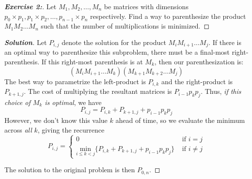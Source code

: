 \documentclass[a4paper]{article}
\newenvironment{solution}{\begin{proof}[\textnormal{\textbf{Solution}}]}{\end{proof}}
\newenvironment{exercise}[1]{\begin{proof}[\textnormal{\textbf{Exercise #1:}}]\phantom{\qedhere}}{\end{proof}}
\theoremstyle{definition}
\begin{document}
\begin{exercise}{2}
 Let $M_1, M_2, \hdots, M_n$ be matrices with dimensions $p_0\times p_1, p_1\times p_2, \hdots, p_{n-1}\times p_n$ respectively. Find a way to parenthesize the product $M_1M_2\hdots M_n$ such that the number of multiplications is minimized.
\end{exercise}

\begin{solution}
 Let $P_{i,j}$ denote the solution for the product $M_iM_{i+1}\hdots M_j$. If there is an optimal way to parenthesize this subproblem, there must be a final-most right-parenthesis. If this right-most parenthesis is at $M_k$, then our parenthesization is: \[\left(M_iM_{i+1}\hdots M_k\right)\left(M_{k+1}M_{k+2}\hdots M_j\right)\] The best way to parametrize the left-product is $P_{i,k}$ and the right-product is $P_{k+1,j}$. The cost of multiplying the resultant matrices is $P_{i-1}p_kp_j$. Thus, \textit{if this choice of $M_k$ is optimal}, we have \[P_{i,j}=P_{i,k}+P_{k+1,j}+p_{i-1}p_kp_j\] However, we don't know this value $k$ ahead of time, so we evaluate the minimum across \textit{all} $k$, giving the recurrence 
  \[P_{i,j} = \begin{cases} 
       0 & \text{ if }i=j \\
       \underset{i\leq k<j}{\text{min}}\{P_{i,k}+P_{k+1,j}+p_{i-1}p_kp_j\} & \text{ if }i\neq j
   \end{cases}\]
   
 The solution to the original problem is then $P_{0,n}$. 
\end{solution}
\end{document}
